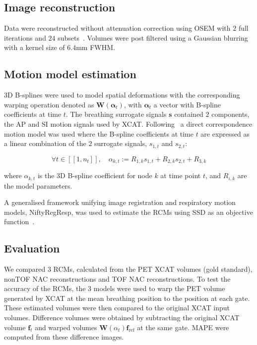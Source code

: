 \documentclass[10pt,twocolumn,twoside,letterpaper]{IEEEtran}
\begin{document}
\subsection{Image reconstruction}
Data were reconstructed without attenuation correction using \gls{OSEM} with $2$ full iterations and $24$ subsets~\cite{Hudson1994}. Volumes were post filtered using a Gaussian blurring with a kernel size of $6.4$mm \gls{FWHM}.

\subsection{Motion model estimation}
3D B-splines were used to model spatial deformations with the corresponding warping operation denoted as $\mathbf{W}(\mathbf{\alpha}_t)$, with $\mathbf{\alpha}_t$ a vector with B-spline coefficients at time $t$. The breathing surrogate signals $\mathbf{s}$ contained $2$ components, the \gls{AP} and \gls{SI} motion signals used by \gls{XCAT}.  Following~\cite{McClelland2017} a direct correspondence motion model was used where the B-spline coefficients at time $t$ are expressed as a linear combination of the $2$ surrogate signals, $s_{1,t}$ and $s_{2,t}$:

\begin{equation}
    \forall t \in [[1,n_t]],\quad \alpha_{k,t} := R_{1,k} s_{1,t} + R_{2,k} s_{2,t} + R_{3,k}
\end{equation}

\noindent where $\alpha_{k,t}$ is the 3D B-spline coefficient for node $k$ at time point $t$, and $R_{i,k}$ are the model parameters. 

A generalised framework unifying image registration and respiratory motion models, NiftyRegResp, was used to estimate the \gls{RCM}s %
using \gls{SSD} as an objective function~\cite{McClelland2017}.

\subsection{Evaluation}
We compared $3$ \gls{RCM}s, calculated from the \gls{PET} \gls{XCAT} volumes (gold standard), \gls{nonTOF} \gls{NAC} reconstructions and \gls{TOF} \gls{NAC} reconstructions. To test the accuracy of the \gls{RCM}s, the $3$ models were used to warp the \gls{PET} volume generated by \gls{XCAT} at the mean breathing position to the position at each gate. These estimated volumes were then compared to the original \gls{XCAT} input volumes. Difference volumes were obtained by subtracting the original \gls{XCAT} volume $\mathbf{f}_t$ and warped volumes $\mathbf{W}(\alpha_t) \mathbf{f}_\mathrm{ref}$ at the same gate. \gls{MAPE} were computed from these difference images.
\end{document}
